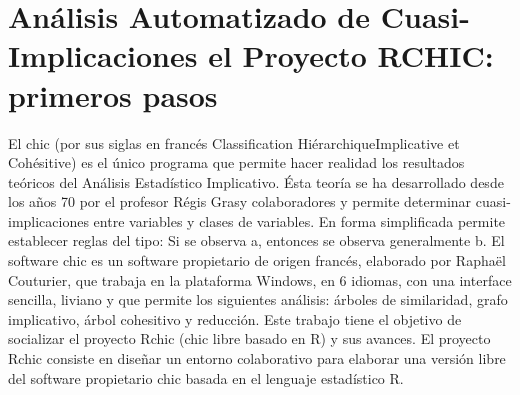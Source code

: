 \chapter{Análisis Automatizado de Cuasi-Implicaciones el Proyecto RCHIC: primeros pasos}




El chic (por sus siglas en francés Classification HiérarchiqueImplicative et Cohésitive) es el único programa que permite hacer realidad los resultados teóricos del Análisis Estadístico Implicativo. Ésta teoría se ha desarrollado desde los años 70 por el profesor Régis Grasy colaboradores y permite determinar cuasi-implicaciones entre variables y clases de variables. En forma simplificada permite establecer reglas del tipo: Si se observa a, entonces se observa generalmente b. El software chic es un software propietario de origen francés, elaborado por Raphaël Couturier, que trabaja en la plataforma Windows, en 6 idiomas, con una interface sencilla, liviano y que permite los siguientes análisis: árboles de similaridad, grafo implicativo, árbol cohesitivo y reducción. Este trabajo tiene el objetivo de socializar el proyecto Rchic (chic libre basado en R) y sus avances. El proyecto Rchic consiste en diseñar un entorno colaborativo para elaborar una versión libre del software propietario chic basada en el lenguaje estadístico R. 

%

%

